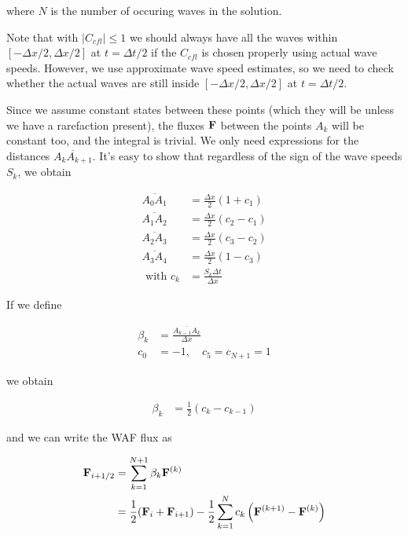 where $N$ is the number of occuring waves in the solution.





Note that with $|C_{cfl}| \leq 1$ we should always have all the waves within $[-\Delta x /2, \Delta x / 2]$ at $t = \Delta t / 2$ if the $C_{cfl}$ is chosen properly using actual wave speeds.
However, we use approximate wave speed estimates, so we need to check whether the actual waves are still inside $[-\Delta x /2, \Delta x / 2]$ at $t = \Delta t / 2$.



Since we assume constant states between these points (which they will be unless we have a rarefaction present), the fluxes $\mathbf{F}$ between the points $A_k$ will be constant too, and the integral is trivial.
We only need expressions for the distances $\overline{A_{k}A_{k+1}}$.
It's easy to show that regardless of the sign of the wave speeds $S_k$, we obtain

\begin{align*}
	\overline{A_0 A_1} &= 
		\frac{\Delta x}{2} ( 1 + c_1 ) \\
	\overline{A_1 A_2} &= 
		\frac{\Delta x}{2} ( c_2 - c_1 ) \\
	\overline{A_2 A_3} &= 
		\frac{\Delta x}{2} ( c_3 - c_2 ) \\
	\overline{A_3 A_4} &= 
		\frac{\Delta x}{2} ( 1 - c_3 ) \\ 
	\text{ with } c_k &= \frac{S_k \Delta t}{\Delta x}
\end{align*}



If we define

\begin{align*}
	\beta_k &= \frac{\overline{A_{k-1} A_k}}{\Delta x}\\
	c_0 &= -1, \quad c_5 = c_{N+1} = 1
\end{align*}

we obtain

\begin{align*}
	\beta_k &= \frac{1}{2} (c_k - c_{k-1})
\end{align*}

and we can write the WAF flux as

\begin{align}
	\F_{i + \half} 
		&= \sum\limits_{k = 1}^{N+1} \beta_k \F^{(k)} \\
		&= \frac{1}{2} (\F_i + \F_{i+1}) - \frac{1}{2} \sum\limits_{k = 1}^{N} c_k \left (\F^{(k+1)} - \F^{(k)} \right) 
\end{align}




